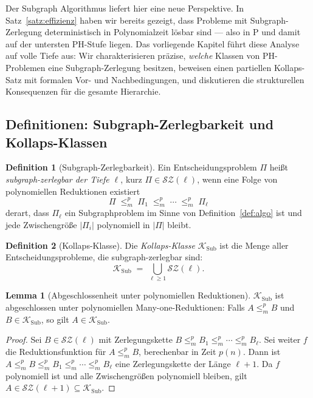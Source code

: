 ﻿\documentclass[a4paper,12pt]{article}
\theoremstyle{definition}
\newtheorem{definition}{Definition}
\newtheorem{lemma}{Lemma}
\begin{document}
Der Subgraph Algorithmus liefert hier eine neue Perspektive.
In Satz~\ref{satz:effizienz} haben wir bereits gezeigt, dass Probleme mit
Subgraph-Zerlegung deterministisch in Polynomialzeit lösbar sind --- also in P
und damit auf der untersten PH-Stufe liegen.
Das vorliegende Kapitel führt diese Analyse auf volle Tiefe aus:
Wir charakterisieren präzise, \emph{welche} Klassen von PH-Problemen
eine Subgraph-Zerlegung besitzen, beweisen einen partiellen Kollaps-Satz
mit formalen Vor- und Nachbedingungen, und diskutieren die strukturellen
Konsequenzen für die gesamte Hierarchie.

\subsection{Definitionen: Subgraph-Zerlegbarkeit und Kollaps-Klassen}

\begin{definition}[Subgraph-Zerlegbarkeit]
\label{def:zerlegbar}
  Ein Entscheidungsproblem $\Pi$ heißt \emph{subgraph-zerlegbar der Tiefe $\ell$},
  kurz $\Pi \in \mathcal{SZ}(\ell)$, wenn eine Folge von polynomiellen
  Reduktionen existiert
  \[
    \Pi \;\leq_m^p\; \Pi_1 \;\leq_m^p\; \cdots \;\leq_m^p\; \Pi_\ell
  \]
  derart, dass $\Pi_\ell$ ein Subgraphproblem im Sinne von Definition~\ref{def:algo}
  ist und jede Zwischengröße $|\Pi_i|$ polynomiell in $|\Pi|$ bleibt.
\end{definition}

\begin{definition}[Kollaps-Klasse]
\label{def:kollapsklasse}
  Die \emph{Kollaps-Klasse} $\mathcal{K}_\mathrm{Sub}$ ist die Menge aller
  Entscheidungsprobleme, die subgraph-zerlegbar sind:
  \[
    \mathcal{K}_\mathrm{Sub} \;=\; \bigcup_{\ell \geq 1} \mathcal{SZ}(\ell).
  \]
\end{definition}

\begin{lemma}[Abgeschlossenheit unter polynomiellen Reduktionen]
\label{lem:abgeschlossen}
  $\mathcal{K}_\mathrm{Sub}$ ist abgeschlossen unter polynomiellen Many-one-Reduktionen:
  Falls $A \leq_m^p B$ und $B \in \mathcal{K}_\mathrm{Sub}$, so gilt $A \in \mathcal{K}_\mathrm{Sub}$.
\end{lemma}

\begin{proof}
  Sei $B \in \mathcal{SZ}(\ell)$ mit Zerlegungskette
  $B \leq_m^p B_1 \leq_m^p \cdots \leq_m^p B_\ell$.
  Sei weiter $f$ die Reduktionsfunktion für $A \leq_m^p B$, berechenbar in Zeit $p(n)$.
  Dann ist $A \leq_m^p B \leq_m^p B_1 \leq_m^p \cdots \leq_m^p B_\ell$
  eine Zerlegungskette der Länge $\ell + 1$.
  Da $f$ polynomiell ist und alle Zwischengrößen polynomiell bleiben,
  gilt $A \in \mathcal{SZ}(\ell+1) \subseteq \mathcal{K}_\mathrm{Sub}$.
\end{proof}
\end{document}
